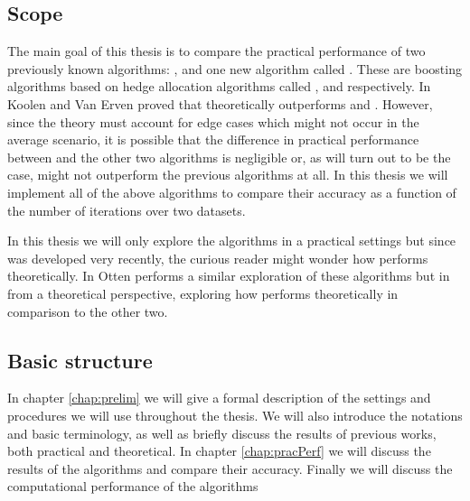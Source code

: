 \subsection{Scope}

The main goal of this thesis is to compare the practical performance of two previously known algorithms: \adaB, \NHB and one new algorithm called \squintB. These are boosting algorithms based on hedge allocation algorithms called \hedge, \adaN and \squint respectively. In \cite{Koolen2015} Koolen and Van Erven proved that \squint theoretically outperforms \hedge and \adaN. However, since the theory must account for edge cases which might not occur in the average scenario, it is possible that the difference in practical performance between \squint and the other two algorithms is negligible or, as will turn out to be the case, \squintB might not outperform the previous algorithms at all. In this thesis we will implement all of the above algorithms to compare their accuracy as a function of the number of iterations over two datasets.

\par In this thesis we will only explore the algorithms in a practical settings but since \squint was developed very recently, the curious reader might wonder how \squintB performs theoretically. In \cite{Otten2016} Otten performs a similar exploration of these algorithms but in from a theoretical perspective, exploring how \squintB performs theoretically in comparison to the other two. 

\subsection{Basic structure}
In chapter \ref{chap:prelim} we will give a formal description of the settings and procedures we will use throughout the thesis. We will also introduce the notations and basic terminology, as well as briefly discuss the results of previous works, both practical and theoretical. In chapter \ref{chap:pracPerf} we will discuss the results of the algorithms and compare their accuracy. Finally we will discuss the computational performance of the algorithms    
